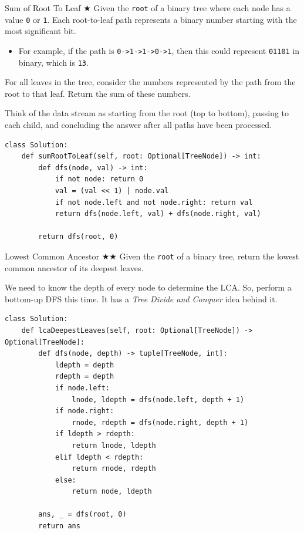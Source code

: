\documentclass{article}
\begin{document}
\begin{Question}{Sum of Root To Leaf
 $\bigstar$}
Given the \texttt{root} of a binary tree where each node has a value \texttt{0} or \texttt{1}. Each root-to-leaf path represents a binary number starting with the most significant bit.

\begin{itemize}
    \item For example, if the path is \texttt{0->1->1->0->1}, then this could represent \texttt{01101} in binary, which is \texttt{13}.
\end{itemize}

For all leaves in the tree, consider the numbers represented by the path from the root to that leaf. Return the sum of these numbers.
\end{Question}

Think of the data stream as starting from the root (top to bottom), passing to each child, and concluding the answer after all paths have been processed.

\begin{lstlisting}[style=python]
class Solution:
    def sumRootToLeaf(self, root: Optional[TreeNode]) -> int:
        def dfs(node, val) -> int:
            if not node: return 0
            val = (val << 1) | node.val
            if not node.left and not node.right: return val
            return dfs(node.left, val) + dfs(node.right, val)
            
        return dfs(root, 0)
\end{lstlisting}

\begin{Question}{Lowest Common Ancestor
 $\bigstar$$\bigstar$}
Given the \texttt{root} of a binary tree, return the lowest common ancestor of its deepest leaves.
\end{Question}

We need to know the depth of every node to determine the LCA. So, perform a bottom-up DFS this time. It has a \emph{Tree Divide and Conquer} idea behind it.

\begin{lstlisting}[style=python]
class Solution:
    def lcaDeepestLeaves(self, root: Optional[TreeNode]) -> Optional[TreeNode]:
        def dfs(node, depth) -> tuple[TreeNode, int]:
            ldepth = depth
            rdepth = depth
            if node.left:
                lnode, ldepth = dfs(node.left, depth + 1)
            if node.right:
                rnode, rdepth = dfs(node.right, depth + 1)
            if ldepth > rdepth:
                return lnode, ldepth
            elif ldepth < rdepth:
                return rnode, rdepth
            else:
                return node, ldepth
                
        ans, _ = dfs(root, 0)
        return ans
\end{lstlisting}
\end{document}

